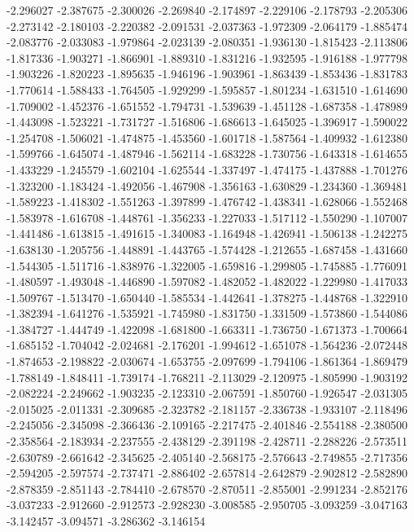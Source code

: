 -2.296027
-2.387675
-2.300026
-2.269840
-2.174897
-2.229106
-2.178793
-2.205306
-2.273142
-2.180103
-2.220382
-2.091531
-2.037363
-1.972309
-2.064179
-1.885474
-2.083776
-2.033083
-1.979864
-2.023139
-2.080351
-1.936130
-1.815423
-2.113806
-1.817336
-1.903271
-1.866901
-1.889310
-1.831216
-1.932595
-1.916188
-1.977798
-1.903226
-1.820223
-1.895635
-1.946196
-1.903961
-1.863439
-1.853436
-1.831783
-1.770614
-1.588433
-1.764505
-1.929299
-1.595857
-1.801234
-1.631510
-1.614690
-1.709002
-1.452376
-1.651552
-1.794731
-1.539639
-1.451128
-1.687358
-1.478989
-1.443098
-1.523221
-1.731727
-1.516806
-1.686613
-1.645025
-1.396917
-1.590022
-1.254708
-1.506021
-1.474875
-1.453560
-1.601718
-1.587564
-1.409932
-1.612380
-1.599766
-1.645074
-1.487946
-1.562114
-1.683228
-1.730756
-1.643318
-1.614655
-1.433229
-1.245579
-1.602104
-1.625544
-1.337497
-1.474175
-1.437888
-1.701276
-1.323200
-1.183424
-1.492056
-1.467908
-1.356163
-1.630829
-1.234360
-1.369481
-1.589223
-1.418302
-1.551263
-1.397899
-1.476742
-1.438341
-1.628066
-1.552468
-1.583978
-1.616708
-1.448761
-1.356233
-1.227033
-1.517112
-1.550290
-1.107007
-1.441486
-1.613815
-1.491615
-1.340083
-1.164948
-1.426941
-1.506138
-1.242275
-1.638130
-1.205756
-1.448891
-1.443765
-1.574428
-1.212655
-1.687458
-1.431660
-1.544305
-1.511716
-1.838976
-1.322005
-1.659816
-1.299805
-1.745885
-1.776091
-1.480597
-1.493048
-1.446890
-1.597082
-1.482052
-1.482022
-1.229980
-1.417033
-1.509767
-1.513470
-1.650440
-1.585534
-1.442641
-1.378275
-1.448768
-1.322910
-1.382394
-1.641276
-1.535921
-1.745980
-1.831750
-1.331509
-1.573860
-1.544086
-1.384727
-1.444749
-1.422098
-1.681800
-1.663311
-1.736750
-1.671373
-1.700664
-1.685152
-1.704042
-2.024681
-2.176201
-1.994612
-1.651078
-1.564236
-2.072448
-1.874653
-2.198822
-2.030674
-1.653755
-2.097699
-1.794106
-1.861364
-1.869479
-1.788149
-1.848411
-1.739174
-1.768211
-2.113029
-2.120975
-1.805990
-1.903192
-2.082224
-2.249662
-1.903235
-2.123310
-2.067591
-1.850760
-1.926547
-2.031305
-2.015025
-2.011331
-2.309685
-2.323782
-2.181157
-2.336738
-1.933107
-2.118496
-2.245056
-2.345098
-2.366436
-2.109165
-2.217475
-2.401846
-2.554188
-2.380500
-2.358564
-2.183934
-2.237555
-2.438129
-2.391198
-2.428711
-2.288226
-2.573511
-2.630789
-2.661642
-2.345625
-2.405140
-2.568175
-2.576643
-2.749855
-2.717356
-2.594205
-2.597574
-2.737471
-2.886402
-2.657814
-2.642879
-2.902812
-2.582890
-2.878359
-2.851143
-2.784410
-2.678570
-2.870511
-2.855001
-2.991234
-2.852176
-3.037233
-2.912660
-2.912573
-2.928230
-3.008585
-2.950705
-3.093259
-3.047163
-3.142457
-3.094571
-3.286362
-3.146154

